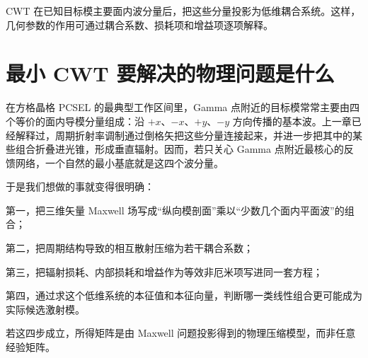 CWT 在已知目标模主要面内波分量后，把这些分量投影为低维耦合系统。这样，几何参数的作用可通过耦合系数、损耗项和增益项逐项解释。

\section{最小 CWT 要解决的物理问题是什么}
在方格晶格 PCSEL 的最典型工作区间里，Gamma 点附近的目标模常常主要由四个等价的面内导模分量组成：沿 $+x$、$-x$、$+y$、$-y$ 方向传播的基本波。上一章已经解释过，周期折射率调制通过倒格矢把这些分量连接起来，并进一步把其中的某些组合折叠进光锥，形成垂直辐射。因而，若只关心 Gamma 点附近最核心的反馈网络，一个自然的最小基底就是这四个波分量。

于是我们想做的事就变得很明确：

第一，把三维矢量 Maxwell 场写成“纵向模剖面”乘以“少数几个面内平面波”的组合；

第二，把周期结构导致的相互散射压缩为若干耦合系数；

第三，把辐射损耗、内部损耗和增益作为等效非厄米项写进同一套方程；

第四，通过求这个低维系统的本征值和本征向量，判断哪一类线性组合更可能成为实际候选激射模。

若这四步成立，所得矩阵是由 Maxwell 问题投影得到的物理压缩模型，而非任意经验矩阵。

